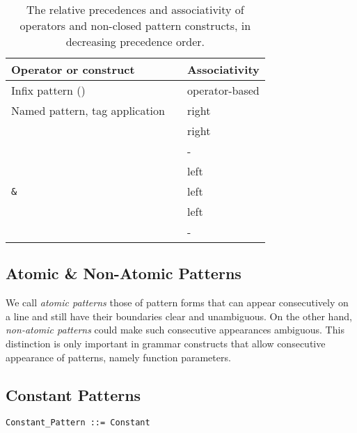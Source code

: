 \begin{table}[h!]
  \caption{The relative precedences and associativity of operators and non-closed pattern constructs, in decreasing precedence order.}
\begin{center}
\begin{tabular}{l l}
  Operator or construct & Associativity \\ \hline \hline
  Infix pattern () & operator-based \\ \hline
  Named pattern, tag application\ \  & right \\ \hline
  \code{::} & right \\ \hline
  \code{=>} & - \\ \hline
  \code{,} & left \\ \hline
  \lstinline!&! & left \\ \hline
  \code{|} & left \\ \hline
   & - \\ \hline
\end{tabular}
\end{center}
\label{table:pattern-matching-op-precedences}
\end{table}%





\subsection{Atomic \& Non-Atomic Patterns}
\label{sec:atomic-patterns}
\label{sec:non-atomic-patterns}

We call {\em atomic patterns} those of pattern forms that can appear consecutively on a line and still have their boundaries clear and unambiguous. On the other hand, {\em non-atomic patterns} could make such consecutive appearances ambiguous. This distinction is only important in grammar constructs that allow consecutive appearance of patterns, namely function parameters. 





\subsection{Constant Patterns}
\label{sec:constant-patterns}

\syntax\begin{lstlisting}
Constant_Pattern ::= Constant
\end{lstlisting}

